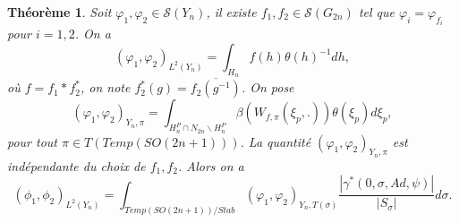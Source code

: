 \documentclass{amsart}
\newtheorem{theoreme}{Théorème}[section]
\begin{document}
\begin{theoreme}
Soit $\varphi_1, \varphi_2 \in \mathcal{S}(Y_n)$, il existe $f_1, f_2 \in \mathcal{S}(G_{2n})$ tel que $\varphi_i = \varphi_{f_i}$ pour $i = 1,2$. On a
\begin{equation}
\label{psf}
(\varphi_1, \varphi_2)_{L^2(Y_n)} = \int_{H_n} f(h) \theta(h)^{-1} dh,
\end{equation}
où $f = f_1 * f_2^{*}$, on note $f_2^*(g) = \overline{f_2(g^{-1})}$. On pose
\begin{equation}
(\varphi_1, \varphi_2)_{Y_n, \pi} = \int_{H^P_n \cap N_{2n} \backslash H^P_n} \beta\left(W_{f,\pi}(\xi_p,.)\right) \theta(\xi_p) d\xi_p,
\end{equation}
pour tout $\pi \in T(Temp(SO(2n+1)))$. La quantité $(\varphi_1, \varphi_2)_{Y_n, \pi}$ est indépendante du choix de $f_1,f_2$. Alors on a
\begin{equation}
(\phi_1, \phi_2)_{L^2(Y_n)} = \int_{Temp(SO(2n+1))/Stab} (\varphi_1, \varphi_2)_{Y_n, T(\sigma)} \frac{|\gamma^*(0, \sigma, Ad, \psi)|}{|S_\sigma|}d\sigma.
\end{equation}
\end{theoreme}
\end{document}
